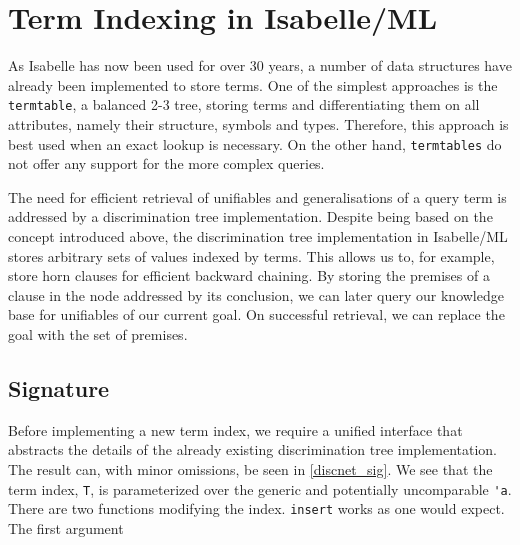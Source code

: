 


\section{Term Indexing in Isabelle/ML}
As Isabelle has now been used for over 30 years, a number of data structures have already been implemented to store terms. One of the simplest approaches is the \verb!termtable!, a balanced 2-3 tree, storing terms and differentiating them on all attributes, namely their structure, symbols and types. Therefore, this approach is best used when an exact lookup is necessary. On the other hand, \verb!termtables! do not offer any support for the more complex queries.

The need for efficient retrieval of unifiables and generalisations of a query term is addressed by a discrimination tree implementation. Despite being based on the concept introduced above, the discrimination tree implementation in Isabelle/ML stores arbitrary sets of values indexed by terms. This allows us to, for example, store horn clauses for efficient backward chaining. By storing the premises of a clause in the node addressed by its conclusion, we can later query our knowledge base for unifiables of our current goal. On successful retrieval, we can replace the goal with the set of premises.

\subsection{Signature}
Before implementing a new term index, we require a unified interface that abstracts the details of the already existing discrimination tree implementation. The result can, with minor omissions, be seen in \cref{discnet_sig}. We see that the term index, \verb!T!, is parameterized over the generic and potentially uncomparable \verb!'a!. There are two functions modifying the index. \verb!insert! works as one would expect. The first argument

